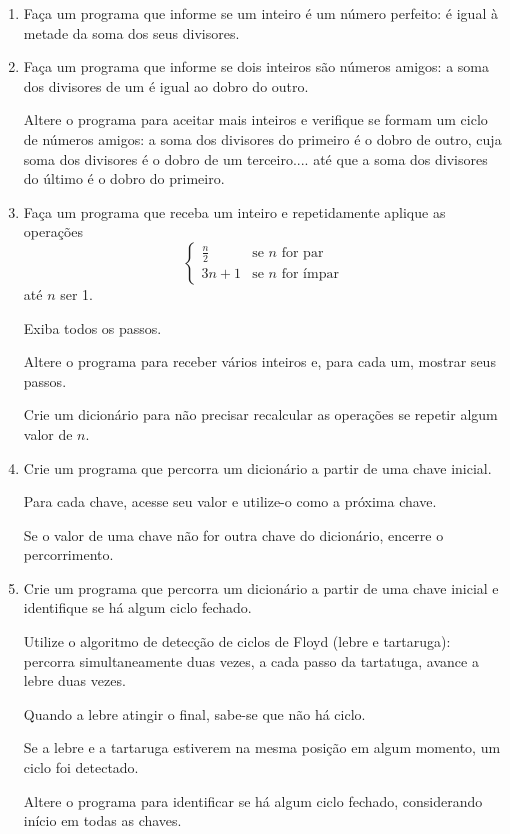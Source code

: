 \begin{enumerate}
	\item Faça um programa que informe se um inteiro é um número perfeito: 
	é igual à metade da soma dos seus divisores.
	
	\item Faça um programa que informe se dois inteiros são números amigos: 
	a soma dos divisores de um é igual ao dobro do outro.
	
	Altere o programa para aceitar mais inteiros e verifique se formam um ciclo de números amigos:
	a soma dos divisores do primeiro é o dobro de outro, cuja soma dos divisores é o dobro de um terceiro.... 
	até que a soma dos divisores do último é o dobro do primeiro.

\quebra	
	
	\item Faça um programa que receba um inteiro e repetidamente aplique as operações
	\begin{equation*}
		\begin{cases}
			\frac{n}{2}	& \text{se $n$ for par}
			\\ 3n + 1	& \text{se $n$ for ímpar}
		\end{cases}
	\end{equation*}   
	até $n$ ser 1.
	
	Exiba todos os passos.
	
	Altere o programa para receber vários inteiros e, para cada um, mostrar seus passos.
	
	Crie um dicionário para não precisar recalcular as operações se repetir algum valor de $n$.
	
	\item Crie um programa que percorra um dicionário a partir de uma chave inicial. 
	
	Para cada chave, acesse seu valor e utilize-o como a próxima chave. 
	
	Se o valor de uma chave não for outra chave do dicionário, encerre o percorrimento.
	
	\item Crie um programa que percorra um dicionário a partir de uma chave inicial e identifique se há algum ciclo fechado.
	
	Utilize o algoritmo de detecção de ciclos de Floyd (lebre e tartaruga):
	percorra simultaneamente duas vezes, a cada passo da tartatuga, avance a lebre duas vezes.
	
	Quando a lebre atingir o final, sabe-se que não há ciclo.
	
	Se a lebre e a tartaruga estiverem na mesma posição em algum momento, um ciclo foi detectado.
	
	Altere o programa para identificar se há algum ciclo fechado, considerando início em todas as chaves.

\end{enumerate}